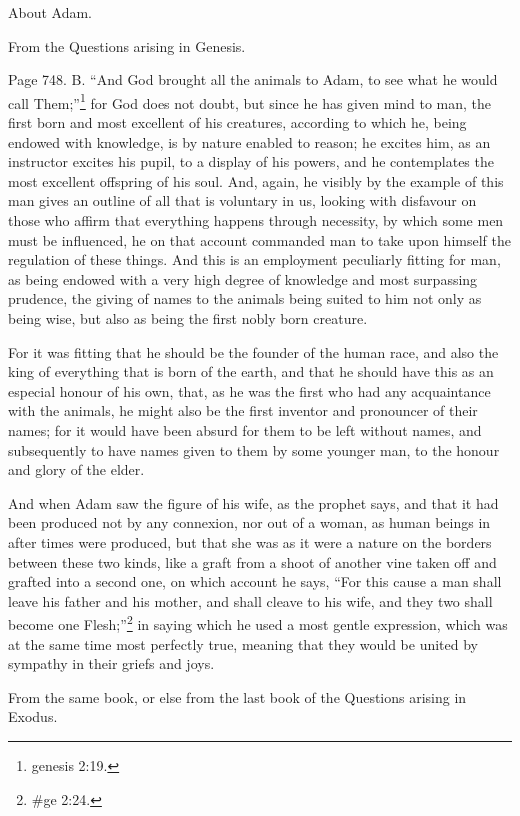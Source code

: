 About Adam.

From the Questions arising in Genesis.

Page 748. B. ``And God brought all the animals to Adam, to see what he would call Them;''\footnote{genesis
2:19.} for God does not doubt, but since he has given mind to man, the first born and most excellent
of his creatures, according to which he, being endowed with knowledge, is by nature enabled to
reason; he excites him, as an instructor excites his pupil, to a display of his powers, and he
contemplates the most excellent offspring of his soul. And, again, he visibly by the example of this
man gives an outline of all that is voluntary in us, looking with disfavour on those who affirm that
everything happens through necessity, by which some men must be influenced, he on that account
commanded man to take upon himself the regulation of these things. And this is an employment
peculiarly fitting for man, as being endowed with a very high degree of knowledge and most
surpassing prudence, the giving of names to the animals being suited to him not only as being wise,
but also as being the first nobly born creature.

For it was fitting that he should be the founder of the human race, and also the king of everything
that is born of the earth, and that he should have this as an especial honour of his own, that, as he
was the first who had any acquaintance with the animals, he might also be the first inventor and
pronouncer of their names; for it would have been absurd for them to be left without names, and
subsequently to have names given to them by some younger man, to the honour and glory of the
elder.

And when Adam saw the figure of his wife, as the prophet says, and that it had been produced not
by any connexion, nor out of a woman, as human beings in after times were produced, but that she
was as it were a nature on the borders between these two kinds, like a graft from a shoot of
another vine taken off and grafted into a second one, on which account he says, ``For this cause a
man shall leave his father and his mother, and shall cleave to his wife, and they two shall become
one Flesh;''\footnote{\#ge 2:24.} in saying which he used a most gentle expression, which was at the
same time most perfectly true, meaning that they would be united by sympathy in their griefs and
joys.

From the same book, or else from the last book of the Questions arising in Exodus.

